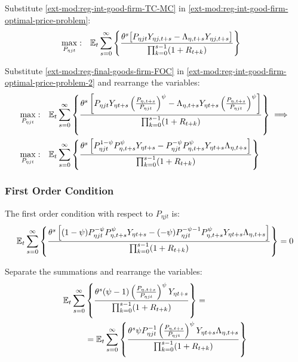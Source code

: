 \documentclass[../thesis.tex]{subfiles}
\begin{document}

Substitute \ref{ext-mod:reg-int-good-firm-TC-MC} in \ref{ext-mod:reg-int-good-firm-optimal-price-problem}:
\begin{align}
	\label{ext-mod:reg-int-good-firm-optimal-price-problem-2}
	\max_{P_{\eta jt}}: & \quad {\mathbb{E}_{t}} \sum_{s=0}^{\infty} \left\{ \frac{\theta^s \big[ P_{\eta jt} Y_{\eta j,t+s} - \Lambda_{\eta, t+s} Y_{\eta j,t+s} \big]}{\prod_{k=0}^{s-1}(1+R_{t+k})} \right\}
\end{align}

Substitute \ref{ext-mod:reg-final-goods-firm-FOC} in \ref{ext-mod:reg-int-good-firm-optimal-price-problem-2} and rearrange the variables:
\begin{align}
	\max_{P_{\eta jt}}: & \quad {\mathbb{E}_{t}} \sum_{s=0}^{\infty} \left\{ \frac{\theta^s \left[ P_{\eta jt} Y_{\eta t+s} \left( \frac{P_{\eta, t+s}}{P_{\eta jt}} \right)^{\psi} - \Lambda_{\eta, t+s} Y_{\eta t+s} \left( \frac{P_{\eta, t+s}}{P_{\eta jt}} \right)^{\psi} \right]}{\prod_{k=0}^{s-1}(1+R_{t+k})} \right\} \implies \nonumber 
	\\
	\max_{P_{\eta jt}}: & \quad {\mathbb{E}_{t}} \sum_{s=0}^{\infty} \left\{ \frac{\theta^s \left[ P_{\eta jt}^{1-\psi} P_{\eta, t+s}^{\psi} Y_{\eta t+s} - P_{\eta jt}^{-\psi} P_{\eta, t+s}^{\psi} Y_{\eta t+s} \Lambda_{\eta, t+s} \right]}{\prod_{k=0}^{s-1}(1+R_{t+k})} \right\} \nonumber
\end{align}


\subsubsection*{First Order Condition}

The first order condition with respect to $P_{\eta jt}$ is:
\begin{align}
	& \quad {\mathbb{E}_{t}} \sum_{s=0}^{\infty} \left\{ \frac{\theta^s \left[ (1-\psi) P_{\eta jt}^{-\psi} P_{\eta, t+s}^{\psi} Y_{\eta t+s} - (-\psi) P_{\eta jt}^{-\psi-1} P_{\eta, t+s}^{\psi} Y_{\eta t+s} \Lambda_{\eta, t+s} \right]}{\prod_{k=0}^{s-1}(1+R_{t+k})} \right\} = 0 \nonumber
\end{align}


Separate the summations and rearrange the variables:
\begin{align}
	\begin{split}
		{\mathbb{E}_{t}} \sum_{s=0}^{\infty} &\left\{ \frac{\theta^s (\psi-1) \left( \frac{P_{\eta, t+s}} {P_{\eta jt}} \right)^{\psi} Y_{\eta t+s}} {\prod_{k=0}^{s-1} (1+R_{t+k})} \right\} = \\
		&= {\mathbb{E}_{t}} \sum_{s=0}^{\infty} \left\{ \frac{\theta^s \psi P_{\eta jt}^{-1} \left( \frac{P_{\eta, t+s}} {P_{\eta jt}} \right)^{\psi} Y_{\eta t+s} \Lambda_{\eta, t+s}}{\prod_{k=0}^{s-1}(1+R_{t+k})} \right\} \label{ext-mod:reg-int-good-firm-optimal-price-FOC}
	\end{split}
\end{align}
\end{document}
